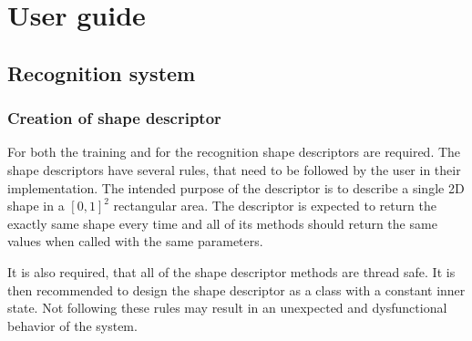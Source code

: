 \appendix
\chapter{User guide}
\section{Recognition system}

\subsection{Creation of shape descriptor}
For both the training and for the recognition shape descriptors are required. The shape descriptors have several rules, that need to be followed by the user in their implementation. The intended purpose of the descriptor is to describe a single 2D shape in a $[0,1]^2$ rectangular area. The descriptor is expected to return the exactly same shape every time and all of its methods should return the same values when called with the same parameters. 

It is also required, that all of the shape descriptor methods are thread safe. It is then recommended to design the shape descriptor as a class with a constant inner state. Not following these rules may result in an unexpected and dysfunctional behavior of the system. 

